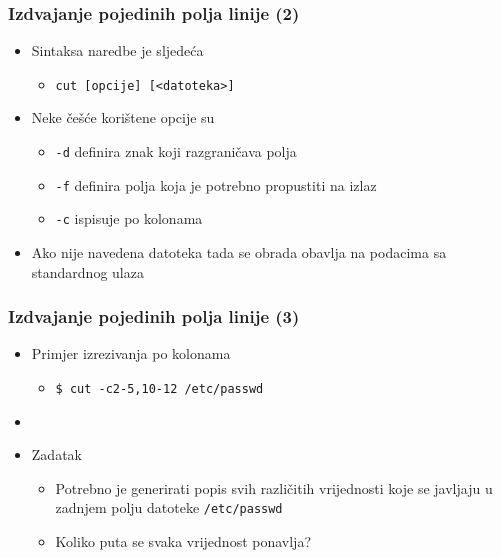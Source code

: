 \documentclass{beamer}
\newcommand{\shell}[1]{\texttt{#1}}
\begin{document}
\begin{frame}[t]
\frametitle{Izdvajanje pojedinih polja linije (2)}
\begin{itemize}
  \item Sintaksa naredbe je sljedeća
  \begin{itemize}
    \item[] \shell{cut [opcije] [<datoteka>]}
  \end{itemize}
  \item Neke češće korištene opcije su
  \begin{itemize}
    \item[] \shell{-d} definira znak koji razgraničava polja
    \item[] \shell{-f} definira polja koja je potrebno propustiti na izlaz
    \item[] \shell{-c} ispisuje po kolonama
  \end{itemize}
  \item Ako nije navedena datoteka tada se obrada obavlja na podacima sa 
        standardnog ulaza
\end{itemize}
\end{frame}

\begin{frame}[t]
\frametitle{Izdvajanje pojedinih polja linije (3)}
\begin{itemize}
  \item Primjer izrezivanja po kolonama
  \begin{itemize}
    \item[] \shell{\$ cut -c2-5,10-12 /etc/passwd}
  \end{itemize}
  \item[]
  \item Zadatak
  \begin{itemize}
    \item Potrebno je generirati popis svih različitih vrijednosti koje se
          javljaju u zadnjem polju datoteke \shell{/etc/passwd}
    \item Koliko puta se svaka vrijednost ponavlja?
  \end{itemize}
\end{itemize}
\end{frame}
\end{document}
